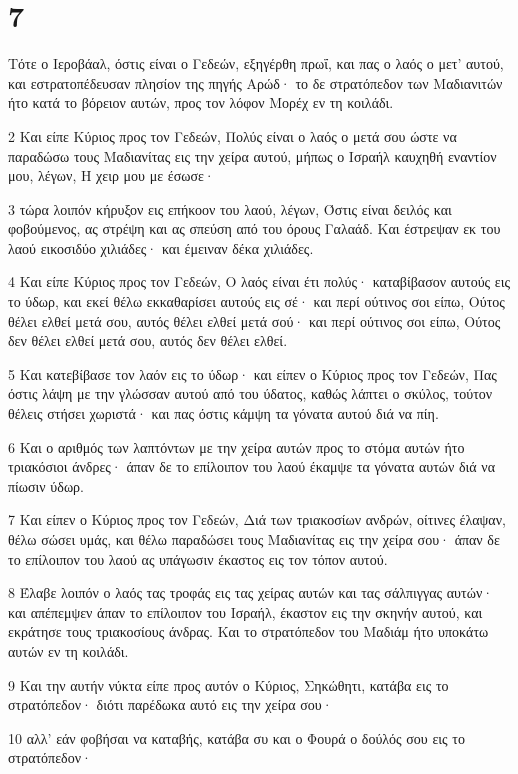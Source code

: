 \chapter{7}

\par Τότε ο Ιεροβάαλ, όστις είναι ο Γεδεών, εξηγέρθη πρωΐ, και πας ο λαός ο μετ' αυτού, και εστρατοπέδευσαν πλησίον της πηγής Αρώδ· το δε στρατόπεδον των Μαδιανιτών ήτο κατά το βόρειον αυτών, προς τον λόφον Μορέχ εν τη κοιλάδι.
\par 2 Και είπε Κύριος προς τον Γεδεών, Πολύς είναι ο λαός ο μετά σου ώστε να παραδώσω τους Μαδιανίτας εις την χείρα αυτού, μήπως ο Ισραήλ καυχηθή εναντίον μου, λέγων, Η χειρ μου με έσωσε·
\par 3 τώρα λοιπόν κήρυξον εις επήκοον του λαού, λέγων, Όστις είναι δειλός και φοβούμενος, ας στρέψη και ας σπεύση από του όρους Γαλαάδ. Και έστρεψαν εκ του λαού εικοσιδύο χιλιάδες· και έμειναν δέκα χιλιάδες.
\par 4 Και είπε Κύριος προς τον Γεδεών, Ο λαός είναι έτι πολύς· καταβίβασον αυτούς εις το ύδωρ, και εκεί θέλω εκκαθαρίσει αυτούς εις σέ· και περί ούτινος σοι είπω, Ούτος θέλει ελθεί μετά σου, αυτός θέλει ελθεί μετά σού· και περί ούτινος σοι είπω, Ούτος δεν θέλει ελθεί μετά σου, αυτός δεν θέλει ελθεί.
\par 5 Και κατεβίβασε τον λαόν εις το ύδωρ· και είπεν ο Κύριος προς τον Γεδεών, Πας όστις λάψη με την γλώσσαν αυτού από του ύδατος, καθώς λάπτει ο σκύλος, τούτον θέλεις στήσει χωριστά· και πας όστις κάμψη τα γόνατα αυτού διά να πίη.
\par 6 Και ο αριθμός των λαπτόντων με την χείρα αυτών προς το στόμα αυτών ήτο τριακόσιοι άνδρες· άπαν δε το επίλοιπον του λαού έκαμψε τα γόνατα αυτών διά να πίωσιν ύδωρ.
\par 7 Και είπεν ο Κύριος προς τον Γεδεών, Διά των τριακοσίων ανδρών, οίτινες έλαψαν, θέλω σώσει υμάς, και θέλω παραδώσει τους Μαδιανίτας εις την χείρα σου· άπαν δε το επίλοιπον του λαού ας υπάγωσιν έκαστος εις τον τόπον αυτού.
\par 8 Έλαβε λοιπόν ο λαός τας τροφάς εις τας χείρας αυτών και τας σάλπιγγας αυτών· και απέπεμψεν άπαν το επίλοιπον του Ισραήλ, έκαστον εις την σκηνήν αυτού, και εκράτησε τους τριακοσίους άνδρας. Και το στρατόπεδον του Μαδιάμ ήτο υποκάτω αυτών εν τη κοιλάδι.
\par 9 Και την αυτήν νύκτα είπε προς αυτόν ο Κύριος, Σηκώθητι, κατάβα εις το στρατόπεδον· διότι παρέδωκα αυτό εις την χείρα σου·
\par 10 αλλ' εάν φοβήσαι να καταβής, κατάβα συ και ο Φουρά ο δούλός σου εις το στρατόπεδον·
